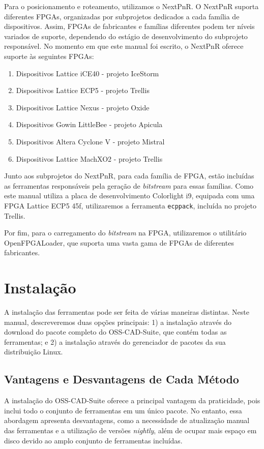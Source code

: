 \documentclass{report}
\begin{document}
Para o posicionamento e roteamento, utilizamos o NextPnR. O NextPnR suporta diferentes FPGAs, organizadas por subprojetos dedicados a cada família de dispositivos. Assim, FPGAs de fabricantes e famílias diferentes podem ter níveis variados de suporte, dependendo do estágio de desenvolvimento do subprojeto responsável. No momento em que este manual foi escrito, o NextPnR oferece suporte às seguintes FPGAs:

\begin{enumerate}
    \item Dispositivos Lattice iCE40 - projeto IceStorm
    \item Dispositivos Lattice ECP5 - projeto Trellis
    \item Dispositivos Lattice Nexus - projeto Oxide
    \item Dispositivos Gowin LittleBee - projeto Apicula
    \item Dispositivos Altera Cyclone V - projeto Mistral
    \item Dispositivos Lattice MachXO2 - projeto Trellis
\end{enumerate}

Junto aos subprojetos do NextPnR, para cada família de FPGA, estão incluídas as ferramentas responsáveis pela geração de \textit{bitstream} para essas famílias. Como este manual utiliza a placa de desenvolvimento Colorlight i9, equipada com uma FPGA Lattice ECP5 45f, utilizaremos a ferramenta \texttt{ecppack}, incluída no projeto Trellis.

Por fim, para o carregamento do \textit{bitstream} na FPGA, utilizaremos o utilitário OpenFPGALoader, que suporta uma vasta gama de FPGAs de diferentes fabricantes.

\section{Instalação}

A instalação das ferramentas pode ser feita de várias maneiras distintas. Neste manual, descreveremos duas opções principais: 1) a instalação através do download do pacote completo do OSS-CAD-Suite, que contém todas as ferramentas; e 2) a instalação através do gerenciador de pacotes da sua distribuição Linux.

\subsection{Vantagens e Desvantagens de Cada Método}

A instalação do OSS-CAD-Suite oferece a principal vantagem da praticidade, pois inclui todo o conjunto de ferramentas em um único pacote. No entanto, essa abordagem apresenta desvantagens, como a necessidade de atualização manual das ferramentas e a utilização de versões \textit{nightly}, além de ocupar mais espaço em disco devido ao amplo conjunto de ferramentas incluídas.
\end{document}
